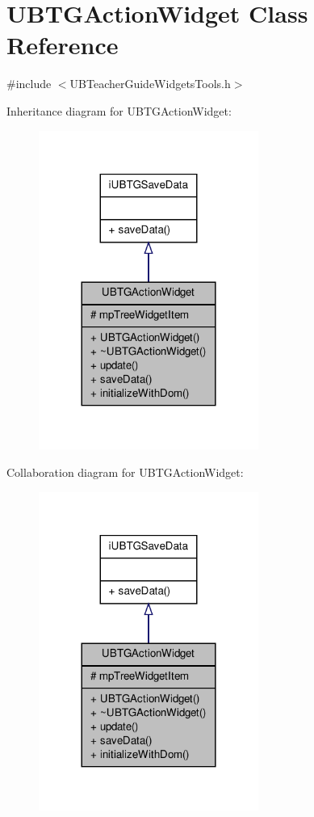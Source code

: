 \hypertarget{class_u_b_t_g_action_widget}{\section{U\-B\-T\-G\-Action\-Widget Class Reference}
\label{da/d7c/class_u_b_t_g_action_widget}
}


{\ttfamily \#include $<$U\-B\-Teacher\-Guide\-Widgets\-Tools.\-h$>$}



Inheritance diagram for U\-B\-T\-G\-Action\-Widget\-:
\nopagebreak
\begin{figure}[H]
\begin{center}
\leavevmode
\includegraphics[width=204pt]{d1/d54/class_u_b_t_g_action_widget__inherit__graph}
\end{center}
\end{figure}


Collaboration diagram for U\-B\-T\-G\-Action\-Widget\-:
\nopagebreak
\begin{figure}[H]
\begin{center}
\leavevmode
\includegraphics[width=204pt]{d5/da4/class_u_b_t_g_action_widget__coll__graph}
\end{center}
\end{figure}
